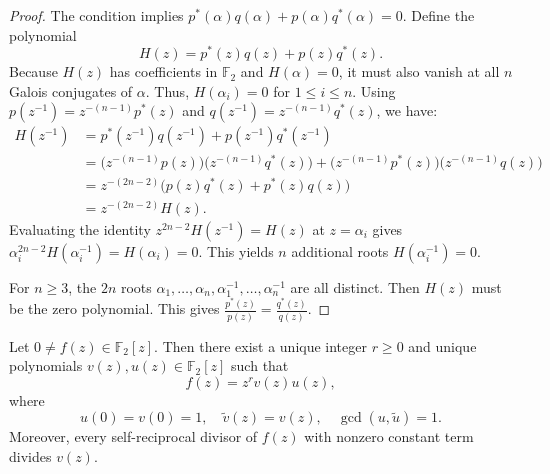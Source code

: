 \documentclass[hidelinks,onefignum,onetabnum]{siamart251216}
\theoremstyle{definition}
\theoremstyle{remark}
\begin{document}
\begin{proof}
	The condition implies $p^*(\alpha)q(\alpha) + p(\alpha)q^*(\alpha) = 0$. Define the polynomial
	\begin{equation}
		H(z) = p^*(z)q(z) + p(z)q^*(z).
	\end{equation}
	Because $H(z)$ has coefficients in $\mathbb{F}_2$ and $H(\alpha) = 0$, it must also vanish at all $n$ Galois conjugates of $\alpha$. Thus, $H(\alpha_i) = 0$ for $1 \le i \le n$. Using  $p(z^{-1}) = z^{-(n-1)}p^*(z)$ and $q(z^{-1}) = z^{-(n-1)}q^*(z)$, we have:
	\begin{align*}
		H(z^{-1}) &= p^*(z^{-1})q(z^{-1}) + p(z^{-1})q^*(z^{-1}) \\
		&= \big(z^{-(n-1)}p(z)\big)\big(z^{-(n-1)}q^*(z)\big) + \big(z^{-(n-1)}p^*(z)\big)\big(z^{-(n-1)}q(z)\big) \\
		&= z^{-(2n-2)} \big( p(z)q^*(z) + p^*(z)q(z) \big) \\
		&= z^{-(2n-2)} H(z).
	\end{align*}
	Evaluating the identity $z^{2n-2}H(z^{-1}) = H(z)$ at $z = \alpha_i$ gives $\alpha_i^{2n-2}H(\alpha_i^{-1}) = H(\alpha_i) = 0$. This yields $n$ additional roots $H(\alpha_i^{-1}) = 0$. 
	
	For $n \ge 3$, the $2n$ roots $\alpha_1, \dots, \alpha_n, \alpha_1^{-1}, \dots, \alpha_n^{-1}$ are all distinct. Then $H(z)$ must be the zero polynomial. This gives $\frac{p^*(z)}{p(z)} = \frac{q^*(z)}{q(z)}$.
	
	
\end{proof}

\begin{lemma}\label{lem:max-selfrec-general}
	Let $0\ne f(z)\in \mathbb F_2[z]$. Then there exist a unique integer $r\ge 0$ and unique
	polynomials $v(z),u(z)\in \mathbb F_2[z]$ such that
	\[
	f(z)=z^r v(z)u(z),
	\]
	where
	\[
	u(0)=v(0)=1,\quad \widetilde{v}(z)=v(z),\quad \gcd(u,\widetilde{u})=1.
	\]
	Moreover, every self-reciprocal divisor of $f(z)$ with nonzero constant term divides $v(z)$.
\end{lemma}
\end{document}
